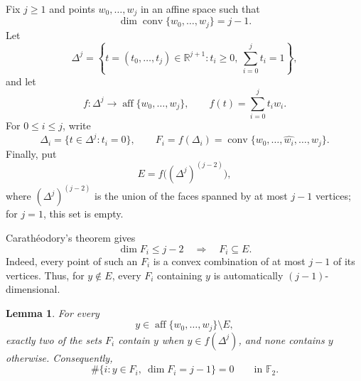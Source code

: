 \documentclass[reqno,12pt]{amsart}
\newtheorem{lemma}[theorem]{Lemma}
\theoremstyle{definition}
\DeclareMathOperator{\conv}{conv}
\newcommand{\F}{\mathbb F_2}
\begin{document}
Fix \(j\geq1\) and points \(w_0,\ldots,w_j\) in an affine space such
that
\[
 \dim\conv\{w_0,\ldots,w_j\}=j-1.
\]
Let
\[
 \Delta^j
 =
 \left\{t=(t_0,\ldots,t_j)\in\mathbb R^{j+1}:
 t_i\geq0,\ \sum_{i=0}^j t_i=1\right\},
\]
and let
\[
 f:\Delta^j\longrightarrow
 \operatorname{aff}\{w_0,\ldots,w_j\},
 \qquad
 f(t)=\sum_{i=0}^j t_iw_i.
\]
For \(0\leq i\leq j\), write
\[
 \Delta_i=\{t\in\Delta^j:t_i=0\},
 \qquad
 F_i=f(\Delta_i)
     =\conv\{w_0,\ldots,\widehat{w_i},\ldots,w_j\}.
\]
Finally, put
\[
 E=f\bigl((\Delta^j)^{(j-2)}\bigr),
\]
where \((\Delta^j)^{(j-2)}\) is the union of the faces spanned by at
most \(j-1\) vertices; for \(j=1\), this set is empty.

Carath\'eodory's theorem gives
\begin{equation}\label{eq:low-dimensional-facet-image}
 \dim F_i\leq j-2
 \quad\Longrightarrow\quad
 F_i\subseteq E.
\end{equation}
Indeed, every point of such an \(F_i\) is a convex combination of at
most \(j-1\) of its vertices.  Thus, for \(y\notin E\), every \(F_i\)
containing \(y\) is automatically \((j-1)\)-dimensional.

\begin{lemma}
\label{lem:generic-degenerate-fiber}
For every
\[
 y\in\operatorname{aff}\{w_0,\ldots,w_j\}\setminus E,
\]
exactly two of the sets \(F_i\) contain \(y\) when
\(y\in f(\Delta^j)\), and none contains \(y\) otherwise.  Consequently,
\[
 \#\{i:y\in F_i,\ \dim F_i=j-1\}=0
 \qquad\text{in }\F.
\]
\end{lemma}
\end{document}
